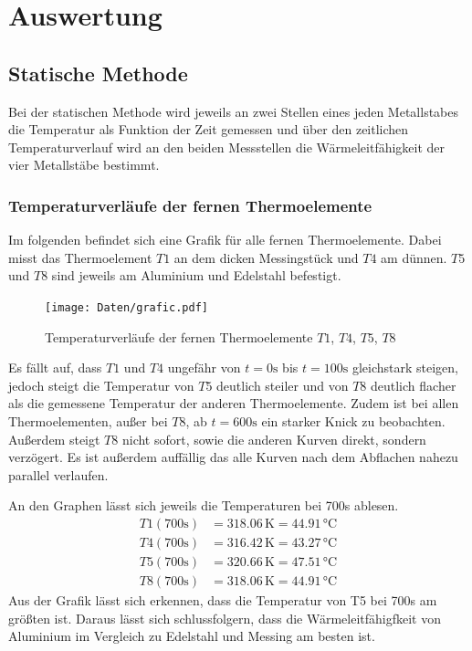 \newpage
\noindent
\section{Auswertung}
    \subsection{Statische Methode}
        Bei der statischen Methode wird jeweils an zwei Stellen eines jeden Metallstabes die Temperatur als Funktion der Zeit gemessen und über den zeitlichen
        Temperaturverlauf wird an den beiden Messstellen die Wärmeleitfähigkeit der vier Metallstäbe bestimmt.

        \subsubsection{Temperaturverläufe der fernen Thermoelemente}
        Im folgenden befindet sich eine Grafik für alle fernen Thermoelemente. Dabei misst das Thermoelement $T1$ an dem dicken Messingstück und $T4$ am dünnen. $T5$ und $T8$ sind
        jeweils am Aluminium und Edelstahl befestigt.

        \begin{figure}
               \centering
               \texttt{[image: Daten/grafic.pdf]}
               \caption{Temperaturverläufe der fernen Thermoelemente $T1$, $T4$, $T5$, $T8$}
               \label{fig:static_far}
        \end{figure}
\noindent
        Es fällt auf, dass $T1$ und $T4$ ungefähr von $t = 0 \si{\second}$ bis $t = 100 \si{\second}$ gleichstark steigen, jedoch steigt die Temperatur von $T5$ deutlich steiler und von $T8$ deutlich 
        flacher als die gemessene Temperatur der anderen Thermoelemente.
        Zudem ist bei allen Thermoelementen, außer bei $T8$, ab $t = 600 \si{\second}$ ein starker Knick zu beobachten. Außerdem steigt $T8$ nicht sofort, sowie die anderen Kurven direkt, sondern verzögert. 
        Es ist außerdem auffällig das alle Kurven nach dem Abflachen nahezu parallel verlaufen.

\noindent
        An den Graphen lässt sich jeweils die Temperaturen bei 700s ablesen.
        \begin{align*}
         T1(700 \si{\second}) &=  318.06 \, \si{\kelvin} = 44.91 \, \si{\celsius}\\ 
         T4(700 \si{\second}) &=  316.42 \, \si{\kelvin} = 43.27 \, \si{\celsius}\\
         T5(700 \si{\second}) &=  320.66 \, \si{\kelvin} = 47.51 \, \si{\celsius}\\
         T8(700 \si{\second}) &=  318.06 \, \si{\kelvin} = 44.91 \, \si{\celsius}
        \end{align*}
\noindent
        Aus der Grafik lässt sich erkennen, dass die Temperatur von T5 bei 700s am größten ist. Daraus lässt sich schlussfolgern, dass die Wärmeleitfähigfkeit von Aluminium im Vergleich zu Edelstahl und Messing am besten ist.

